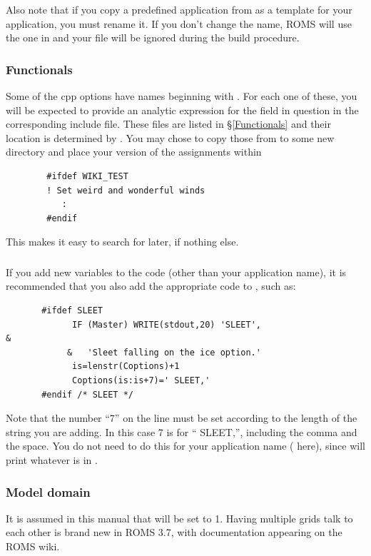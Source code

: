 Also note that if you copy a predefined application from
 as a template for your application, you must
rename it. If you don't change the name, ROMS will use the one in
 and your file will be ignored during the build
procedure.

\subsubsection{Functionals}

Some of the cpp options have names beginning with . For each one of
these, you will be expected to provide an analytic expression for the field
in question in the corresponding include file. These files
are listed in \S\ref{Functionals} and their location is determined
by . You may chose to copy those from
 to some new directory and place your version of
the assignments within
\begin{verbatim}
        #ifdef WIKI_TEST
        ! Set weird and wonderful winds
           :
        #endif
\end{verbatim}
This makes
it easy to search for later, if nothing else.

\subsubsection{}

If you add new  variables to the code (other than your
application name), it is recommended that you also add the appropriate
code to , such as:
\begin{verbatim}
       #ifdef SLEET
             IF (Master) WRITE(stdout,20) 'SLEET',                      &
            &   'Sleet falling on the ice option.'
             is=lenstr(Coptions)+1
             Coptions(is:is+7)=' SLEET,'
       #endif /* SLEET */
\end{verbatim}
Note that the number ``7'' on the  line must be set
according to the length of the string you are adding.  In this case 7
is for `` SLEET,'', including the comma and the space. You do not
need to do this for your application name ( here),
since  will print whatever is in .

\subsubsection{Model domain}
\label{Muddy}
It is assumed in this manual that  will be set to 1.
Having multiple grids talk to each other is brand new in ROMS 3.7,
with documentation appearing on the ROMS wiki.

